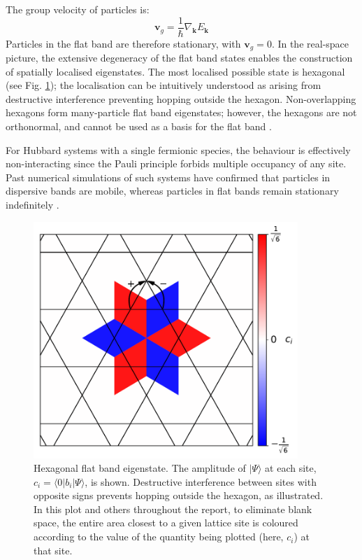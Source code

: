 The group velocity of particles is:
\begin{equation}\label{Eq:GroupVelocity}
    \textbf{v}_g=\frac{1}{\hbar}\nabla_{\textbf{k}}E_{\textbf{k}}
\end{equation}
Particles in the flat band are therefore stationary, with $\textbf{v}_g=0$. In the real-space picture, the extensive degeneracy of the flat band states enables the construction of spatially localised eigenstates. The most localised possible state is hexagonal (see Fig. \ref{Fig:Hexagon_Eigenstate}); the localisation can be intuitively understood as arising from destructive interference preventing hopping outside the hexagon. Non-overlapping hexagons form many-particle flat band eigenstates; however, the hexagons are not orthonormal, and cannot be used as a basis for the flat band \cite{Huber}.

For Hubbard systems with a single fermionic species, the behaviour is effectively non-interacting since the Pauli principle forbids multiple occupancy of any site. Past numerical simulations of such systems have confirmed that particles in dispersive bands are mobile, whereas particles in flat bands remain stationary indefinitely \cite{Chien14-1,Apaja,Hyrkas}.

\newpage

\begin{figure}[ht!]
    \centering
    \includegraphics[width=10cm]{Figures/Hexagon_Eigenstate}
    \caption{Hexagonal flat band eigenstate. The amplitude of $|\Psi\rangle$ at each site, $c_i=\langle0|b_i|\Psi\rangle$, is shown.  Destructive interference between sites with opposite signs prevents hopping outside the hexagon, as illustrated. In this plot and others throughout the report, to eliminate blank space, the entire area closest to a given lattice site is coloured according to the value of the quantity being plotted (here, $c_i$) at that site.}
    \label{Fig:Hexagon_Eigenstate}
\end{figure}


